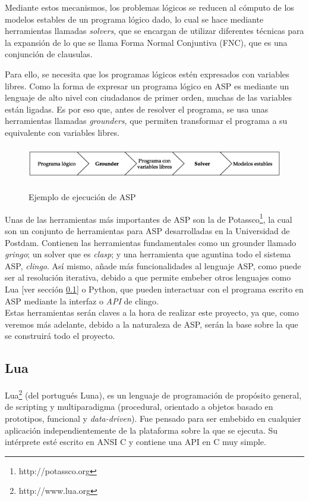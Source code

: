 Mediante estos mecanismos, los problemas lógicos se reducen al cómputo de los modelos estables de un programa lógico dado, lo cual se hace mediante herramientas llamadas \textit{solvers}, que se encargan de utilizar diferentes técnicas para la expansión de lo que se llama Forma Normal Conjuntiva (FNC), que es una conjunción de clausulas.

Para ello, se necesita que los programas lógicos estén expresados con variables libres. Como la forma de expresar un programa lógico en ASP es mediante un lenguaje de alto nivel con ciudadanos de primer orden, muchas de las variables están ligadas. Es por eso que, antes de resolver el programa, se usa unas herramientas llamadas \textit{grounders}, que permiten transformar el programa a su equivalente con variables libres. \\

\begin{figure}
	\centering
	\includegraphics[height=4em]{images/ASP}
	\label{fig:asp}
	\caption{Ejemplo de ejecución de ASP}
\end{figure}

Unas de las herramientas más importantes de ASP son la de Potassco\footnote{http://potassco.org}, la cual son un conjunto de herramientas para ASP desarrolladas en la Universidad de Postdam. Contienen las herramientas fundamentales como un grounder llamado \textit{gringo}; un solver que es \textit{clasp}; y una herramienta que aguntina todo el sistema ASP, \textit{clingo}. Así mismo, añade más funcionalidades al lenguaje ASP, como puede ser al resolución iterativa, debido a que permite embeber otros lenguajes como Lua [ver sección \ref{subsec:lua}] o Python, que pueden interactuar con el programa escrito en ASP mediante la interfaz o \textit{API} de clingo. \\

Estas herramientas serán claves a la hora de realizar este proyecto, ya que, como veremos más adelante, debido a la naturaleza de ASP, serán la base sobre la que se construirá todo el proyecto.

\subsection{Lua}\label{subsec:lua}

Lua\footnote{http://www.lua.org} \cite{Ierusalimschy:2016:PLF:3002843} (del portugués Luna), es un lenguaje de programación de propósito general, de scripting y multiparadigma (procedural, orientado a objetos basado en prototipos, funcional y \textit{data-driven}). Fue pensado para ser embebido en cualquier aplicación independientemente de la plataforma sobre la que se ejecuta. Su intérprete esté escrito en ANSI C y contiene una API en C muy simple. \\


